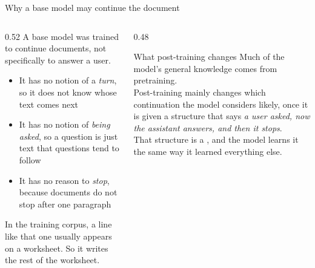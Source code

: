 \documentclass[aspectratio=169,10pt]{beamer}
\begin{document}
\begin{frame}{Why a base model may continue the document}
  \begin{columns}[T]
    \begin{column}{0.52\textwidth}
      A base model was trained to continue documents, not specifically to
      answer a user.
      \vspace{0.5em}
      \begin{itemize}
        \item It has no notion of a \emph{turn}, so it does not know whose
          text comes next
        \item It has no notion of \emph{being asked}, so a question is just
          text that questions tend to follow
        \item It has no reason to \emph{stop}, because documents do not stop
          after one paragraph
      \end{itemize}
      \vspace{0.5em}
      In the training corpus, a line like that one usually appears on a
      worksheet. So it writes the rest of the worksheet.
    \end{column}
    \begin{column}{0.48\textwidth}
      \begin{block}{What post-training changes}
        \small
        Much of the model's general knowledge comes from pretraining.\\[0.5em]
        Post-training mainly changes which continuation the model considers
        likely, once it
        is given a structure that says \emph{a user asked, now the assistant
        answers, and then it stops}.\\[0.5em]
        That structure is a , and the model learns it the
        same way it learned everything else.
      \end{block}
    \end{column}
  \end{columns}
\end{frame}
\end{document}

